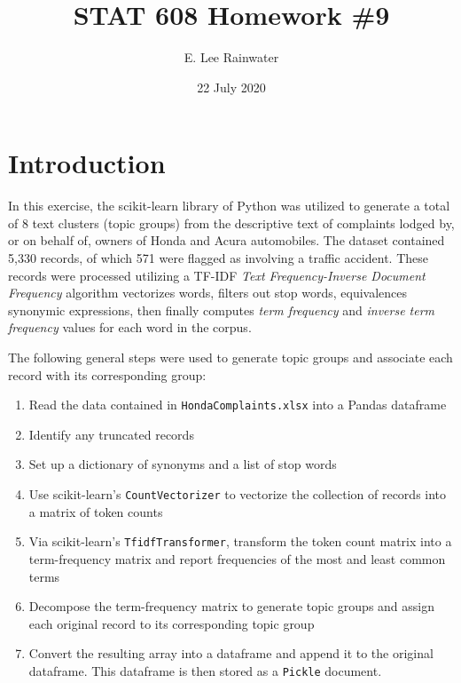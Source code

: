 \documentclass[12pt]{article}
\title{STAT 608 Homework \#9}
\author{E. Lee Rainwater}
\date{22 July 2020}
\begin{document}
\maketitle

\section{Introduction}
In this exercise, the scikit-learn library of Python was utilized to generate a total of 8 text clusters (topic groups) from the descriptive text of complaints lodged by, or on behalf of, owners of Honda and Acura automobiles. The dataset contained 5,330 records, of which 571 were flagged as involving a traffic accident. These records were processed utilizing a TF-IDF \textit{Text Frequency-Inverse Document Frequency} algorithm vectorizes words, filters out stop words, equivalences synonymic expressions, then finally computes \textit{term frequency} and \textit{inverse term frequency} values for each word in the corpus.


The following general steps were used to generate topic groups and associate each record with its corresponding group: 
\begin{enumerate}
\item Read the data contained in  \texttt{HondaComplaints.xlsx} into a Pandas dataframe
\item Identify any truncated records
\item Set up a dictionary of synonyms and a list of stop words
\item Use scikit-learn's \texttt{CountVectorizer} to vectorize the collection of records into a matrix of token counts
\item Via scikit-learn's \texttt{TfidfTransformer}, transform the token count matrix into a term-frequency matrix and report frequencies of the most and least common terms
\item Decompose the term-frequency matrix to generate topic groups and assign each original record to its corresponding topic group
\item Convert the resulting array into a dataframe and append it to the original dataframe. This dataframe is then stored as a \texttt{Pickle} document.
\end{enumerate}
\end{document}
